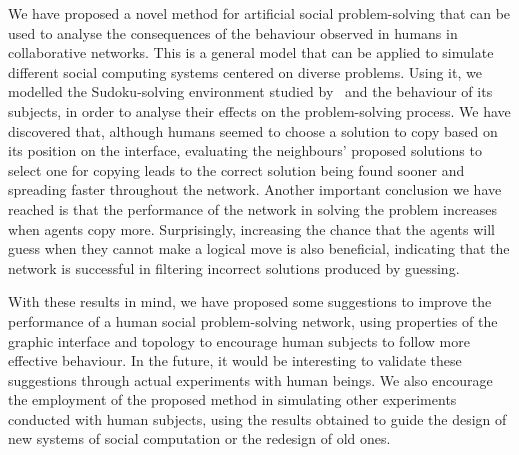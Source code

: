 \documentclass{article}
\begin{document}
We have proposed a novel method for artificial social problem-solving that can be used to analyse the consequences of the behaviour observed in humans in collaborative networks. This is a general model that can be applied to simulate different social computing systems centered on diverse problems. Using it, we modelled the Sudoku-solving environment studied by~\cite{farenzena:collabem} and the behaviour of its subjects, in order to analyse their effects on the problem-solving process. We have discovered that, although humans seemed to choose a solution to copy based on its position on the interface, evaluating the neighbours' proposed solutions to select one for copying leads to the correct solution being found sooner and spreading faster throughout the network. Another important conclusion we have reached is that the performance of the network in solving the problem increases when agents copy more. Surprisingly, increasing the chance that the agents will guess when they cannot make a logical move is also beneficial, indicating that the network is successful in filtering incorrect solutions produced by guessing.

With these results in mind, we have proposed some suggestions to improve the performance of a human social problem-solving network, using properties of the graphic interface and topology to encourage human subjects to follow more effective behaviour. In the future, it would be interesting to validate these suggestions through actual experiments with human beings. We also encourage the employment of the proposed method in simulating other experiments conducted with human subjects, using the results obtained to guide the design of new systems of social computation or the redesign of old ones.



\end{document}
